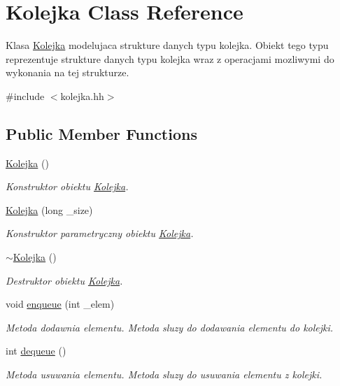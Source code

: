 \hypertarget{class_kolejka}{}\section{Kolejka Class Reference}
\label{class_kolejka}


Klasa \hyperlink{class_kolejka}{Kolejka} modelujaca strukture danych typu kolejka. Obiekt tego typu reprezentuje strukture danych typu kolejka wraz z operacjami mozliwymi do wykonania na tej strukturze.  




{\ttfamily \#include $<$kolejka.\+hh$>$}

\subsection*{Public Member Functions}
\begin{DoxyCompactItemize}
\item 
\hyperlink{class_kolejka_a37c886fdc73dce62b04da0381dec5484}{Kolejka} ()
\begin{DoxyCompactList}\small\item\em Konstruktor obiektu \hyperlink{class_kolejka}{Kolejka}. \end{DoxyCompactList}\item 
\hyperlink{class_kolejka_ac942cc97bf0d2c30d11611c406acc5a8}{Kolejka} (long \+\_\+size)
\begin{DoxyCompactList}\small\item\em Konstruktor parametryczny obiektu \hyperlink{class_kolejka}{Kolejka}. \end{DoxyCompactList}\item 
\hyperlink{class_kolejka_a352f86ff08cd47be6c35c60bb0f873a6}{$\sim$\+Kolejka} ()
\begin{DoxyCompactList}\small\item\em Destruktor obiektu \hyperlink{class_kolejka}{Kolejka}. \end{DoxyCompactList}\item 
void \hyperlink{class_kolejka_a8f3b0111e85f517d9eadb8ce996d4471}{enqueue} (int \+\_\+elem)
\begin{DoxyCompactList}\small\item\em Metoda dodawnia elementu. Metoda sluzy do dodawania elementu do kolejki. \end{DoxyCompactList}\item 
int \hyperlink{class_kolejka_af23261614bcf242a1934a99688a2debc}{dequeue} ()
\begin{DoxyCompactList}\small\item\em Metoda usuwania elementu. Metoda sluzy do usuwania elementu z kolejki. \end{DoxyCompactList}\end{DoxyCompactItemize}
